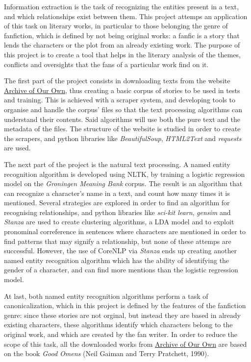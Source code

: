 \documentclass{pre-tfg}
\begin{document}
Information extraction is the task of recognizing the entities present in a text, and which relationships exist between them. This project attemps an application of this task on literary works, in particular to those belonging the genre of fanfiction, which is defined by not being original works: a fanfic is a story that lends the characters or the plot from an already existing work. The purpose of this project is to create a tool that helps in the literary analysis of the themes, conflicts and oversights that the fans of a particular work find on it.

The first part of the project consists in downloading texts from the website \href{http://www.archiveofourown.org}{Archive of Our Own}, thus creating a basic corpus of stories to be used in tests and training. This is achieved with a scraper system, and developing tools to organise and handle the corpus' files so that the text processing algorithms can understand their contents. Said algorithms will use both the pure text and the metadata of the files. The structure of the website is studied in order to create the scrapers, and python libraries like \textit{BeautifulSoup}, \textit{HTML2Text} and \textit{requests} are used.

The next part of the project is the natural text processing. A named entity recognition algorithm is developed using NLTK, by training a logistic regression model on the \textit{Groningen Meaning Bank} corpus. The result is an algorithm that can recognize a character's name in a text, and count how many times it is mentioned. Several strategies are explored in order to find an algorithm for recognising relationships, and python libraries like \textit{sci-kit learn}, \textit{gensim} and \textit{Stanza} are used to create clustering algorithms, a LDA model and to exploit pronominal correference in sentences where characters are mentioned in order to find patterns that may signify a relationship, but none of these attemps are successful. However, the use of CoreNLP via \textit{Stanza} ends up creating another named entity recognition algorithm which has the ability of identifying the gender of a character, and can find more mentions than the logistic regression model.

At last, both named entity recognition algorithms perform a task of canonicalization, which in this project is defined by the features of the fanfiction genre: since these stories are not orginal, but instead they are based in already existing characters, these algorithms identify which characters belong to the original work, and which are created by the fan writer. In order to reduce the scope of this task, all the downloaded works from \href{http://www.archiveofourown.org}{Archive of Our Own} are based on the book \textit{Good Omens} (Neil Gaiman and Terry Pratchett, 1990).
\end{document}
